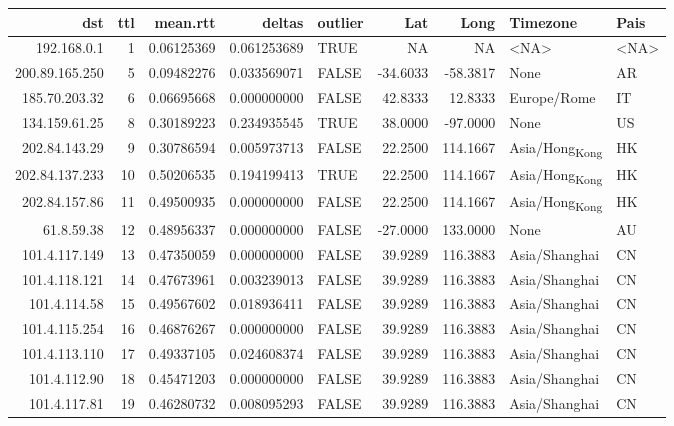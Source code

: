 \documentclass[11pt]{article}
\author{nsm}
\date{\today}
\title{}
\begin{document}
\tableofcontents

\begin{center}
\begin{tabular}{rrrrlrrll}
dst & ttl & mean.rtt & deltas & outlier & Lat & Long & Timezone & Pais\\
\hline
192.168.0.1 & 1 & 0.06125369 & 0.061253689 & TRUE & NA & NA & <NA> & <NA>\\
200.89.165.250 & 5 & 0.09482276 & 0.033569071 & FALSE & -34.6033 & -58.3817 & None & AR\\
185.70.203.32 & 6 & 0.06695668 & 0.000000000 & FALSE & 42.8333 & 12.8333 & Europe/Rome & IT\\
134.159.61.25 & 8 & 0.30189223 & 0.234935545 & TRUE & 38.0000 & -97.0000 & None & US\\
202.84.143.29 & 9 & 0.30786594 & 0.005973713 & FALSE & 22.2500 & 114.1667 & Asia/Hong\textsubscript{Kong} & HK\\
202.84.137.233 & 10 & 0.50206535 & 0.194199413 & TRUE & 22.2500 & 114.1667 & Asia/Hong\textsubscript{Kong} & HK\\
202.84.157.86 & 11 & 0.49500935 & 0.000000000 & FALSE & 22.2500 & 114.1667 & Asia/Hong\textsubscript{Kong} & HK\\
61.8.59.38 & 12 & 0.48956337 & 0.000000000 & FALSE & -27.0000 & 133.0000 & None & AU\\
101.4.117.149 & 13 & 0.47350059 & 0.000000000 & FALSE & 39.9289 & 116.3883 & Asia/Shanghai & CN\\
101.4.118.121 & 14 & 0.47673961 & 0.003239013 & FALSE & 39.9289 & 116.3883 & Asia/Shanghai & CN\\
101.4.114.58 & 15 & 0.49567602 & 0.018936411 & FALSE & 39.9289 & 116.3883 & Asia/Shanghai & CN\\
101.4.115.254 & 16 & 0.46876267 & 0.000000000 & FALSE & 39.9289 & 116.3883 & Asia/Shanghai & CN\\
101.4.113.110 & 17 & 0.49337105 & 0.024608374 & FALSE & 39.9289 & 116.3883 & Asia/Shanghai & CN\\
101.4.112.90 & 18 & 0.45471203 & 0.000000000 & FALSE & 39.9289 & 116.3883 & Asia/Shanghai & CN\\
101.4.117.81 & 19 & 0.46280732 & 0.008095293 & FALSE & 39.9289 & 116.3883 & Asia/Shanghai & CN\\
\end{tabular}
\end{center}
\end{document}
